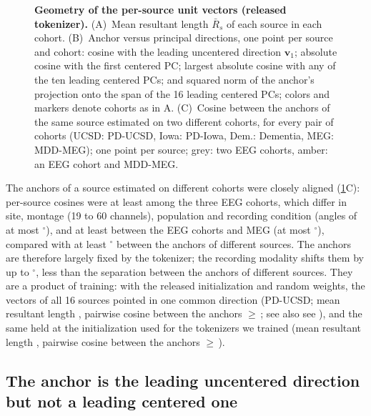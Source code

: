 \documentclass[10pt,letterpaper]{article}
\newcommand{\Rbar}{\bar{R}}
\begin{document}


\begin{figure}[!h]
\caption{{\bf Geometry of the per-source unit vectors (released tokenizer).}
(A)~Mean resultant
  length $\Rbar_s$ of each source in each cohort. (B)~Anchor versus principal directions,
  one point per source and cohort: cosine with the leading uncentered direction $\bm{v}_1$;
  absolute cosine with the first centered PC; largest absolute cosine with any of the ten
  leading centered PCs; and squared norm of the anchor's projection onto the span of the 16
  leading centered PCs; colors and markers denote cohorts as in A. (C)~Cosine between the anchors
  of the same source estimated on two different cohorts, for every pair of cohorts (UCSD: PD-UCSD,
  Iowa: PD-Iowa, Dem.: Dementia, MEG: MDD-MEG); one point per source; grey: two EEG cohorts, amber:
  an EEG cohort and MDD-MEG.}
\label{fig:geometry}
\end{figure}

The anchors of a source estimated on different cohorts were closely aligned
(\cref{fig:geometry}C): per-source cosines were at least \CrossCohortEEGMin{} among the
three EEG cohorts, which differ in site, montage (19 to 60 channels), population and
recording condition (angles of at most \CrossCohortEEGMaxAngle$^\circ$), and at least
\CrossModalMin{} between the EEG cohorts and MEG (at most \CrossModalMaxAngle$^\circ$), compared
with at least \AnchorMinAngleMin$^\circ$ between the anchors of different sources. The anchors are
therefore largely fixed by the tokenizer; the recording modality shifts them by up to
\CrossModalMaxAngle$^\circ$, less than the separation between the anchors of different sources. They
are a product of training: with the released initialization and random
weights, the vectors of all 16 sources pointed in one common direction (PD-UCSD; mean resultant length
\RandomRbar{}, pairwise cosine between the anchors $\geq$\,\RandomOffdiagMin{}; see also
see ), and the same held at the initialization used for the tokenizers we
trained (mean resultant length \InitRbar{}, pairwise cosine between the anchors
$\geq$\,\InitOffdiagMin{}).



\subsection*{The anchor is the leading uncentered direction but not a leading centered one}\label{sec:res-pca}
\end{document}
